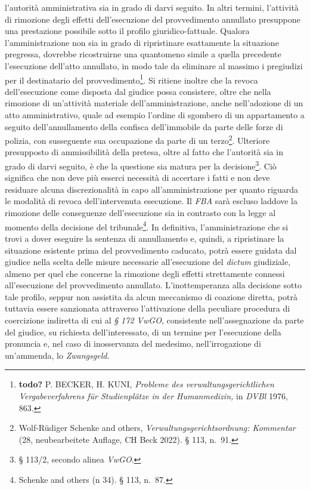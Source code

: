 \documentclass[12pt,it,a4paper,]{report}
\begin{document}
l'autorità amministrativa sia in grado di darvi seguito. In altri
termini, l'attività di rimozione degli effetti dell'esecuzione del
provvedimento annullato presuppone una prestazione possibile sotto il
profilo giuridico-fattuale. Qualora l'amministrazione non sia in grado
di ripristinare esattamente la situazione pregressa, dovrebbe
ricostruirne una quantomeno simile a quella precedente l'esecuzione
dell'atto annullato, in modo tale da eliminare al massimo i pregiudizi
per il destinatario del provvedimento\footnote{\textbf{todo?} P. BECKER,
  H. KUNI, \emph{Probleme des verwaltungsgerichtlichen Vergabeverfahrens
  für Studienplätze in der Humanmedizin,} in \emph{DVBl} 1976, 863.}. Si
ritiene inoltre che la revoca dell'esecuzione come disposta dal giudice
possa consistere, oltre che nella rimozione di un'attività materiale
dell'amministrazione, anche nell'adozione di un atto amministrativo,
quale ad esempio l'ordine di sgombero di un appartamento a seguito
dell'annullamento della confisca dell'immobile da parte delle forze di
polizia, con susseguente sua occupazione da parte di un
terzo\footnote{{Wolf-Rüdiger Schenke and others,
  \emph{Verwaltungsgerichtsordnung: Kommentar} (28, neubearbeitete
  Auflage, CH Beck 2022).} § 113, n.~91.}. Ulteriore presupposto di
ammissibilità della pretesa, oltre al fatto che l'autorità sia in grado
di darvi seguito, è che la questione sia matura per la
decisione\footnote{§ 113/2, secondo alinea \emph{VwGO}.}. Ciò significa
che non deve più esserci necessità di accertare i fatti e non deve
residuare alcuna discrezionalità in capo all'amministrazione per quanto
riguarda le modalità di revoca dell'intervenuta esecuzione. Il
\emph{FBA} sarà escluso laddove la rimozione delle conseguenze
dell'esecuzione sia in contrasto con la legge al momento della decisione
del tribunale\footnote{{Schenke and others (n 34).} § 113, n.~87.}. In
definitiva, l'amministrazione che si trovi a dover eseguire la sentenza
di annullamento e, quindi, a ripristinare la situazione esistente prima
del provvedimento caducato, potrà essere guidata dal giudice nella
scelta delle misure necessarie all'esecuzione del \emph{dictum}
giudiziale, almeno per quel che concerne la rimozione degli effetti
strettamente connessi all'esecuzione del provvedimento annullato.
L'inottemperanza alla decisione sotto tale profilo, seppur non assistita
da alcun meccanismo di coazione diretta, potrà tuttavia essere
sanzionata attraverso l'attivazione della peculiare procedura di
coercizione indiretta di cui al \emph{§ 172 VwGO}, consistente
nell'assegnazione da parte del giudice, su richiesta dell'interessato,
di un termine per l'esecuzione della pronuncia e, nel caso di
inosservanza del medesimo, nell'irrogazione di un'ammenda, lo
\emph{Zwangsgeld}.
\end{document}
